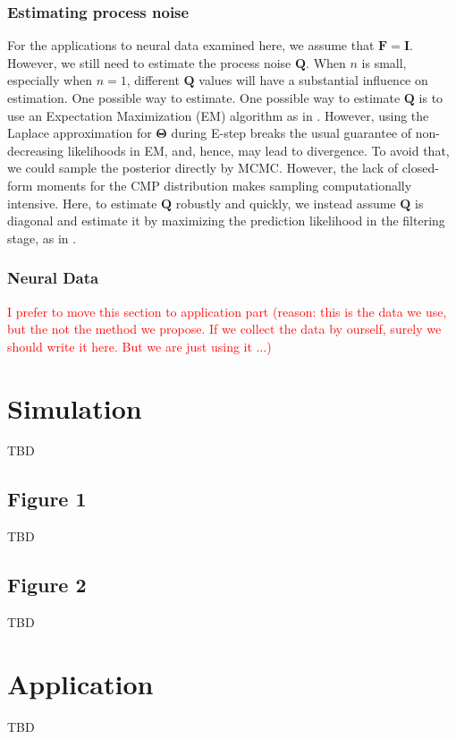 \documentclass[aoas]{imsart}
\theoremstyle{plain}
\theoremstyle{remark}
\begin{document}
\subsubsection{Estimating process noise}
For the applications to neural data examined here, we assume that $\bm{F}=\bm{I}$. However, we still need to estimate the process noise $\bm{Q}$. When $n$ is small, especially when $n=1$, different $\bm{Q}$ values will have a substantial influence on estimation. One possible way to estimate. One possible way to estimate $\bm{Q}$ is to use an Expectation Maximization (EM) algorithm as in \cite{Macke2011}. However, using the Laplace approximation for $\bm{\Theta}$ during E-step breaks the usual guarantee of non-decreasing likelihoods in EM, and, hence, may lead to divergence. To avoid that, we could sample the posterior directly by MCMC. However, the lack of closed-form moments for the CMP distribution makes sampling computationally intensive. Here, to estimate $\bm{Q}$ robustly and quickly, we instead assume $\bm{Q}$ is diagonal and estimate it by maximizing the prediction likelihood in the filtering stage, as in \cite{Wei2021}. 


\subsubsection{Neural Data}

\textcolor{red}{I prefer to move this section to application part (reason: this is the data we use, but the not the method we propose. If we collect the data by ourself, surely we should write it here. But we are just using it $\ldots$)}

\section{Simulation}
TBD

\subsection{Figure 1}
TBD

\subsection{Figure 2}
TBD

\section{Application}
TBD
\end{document}
